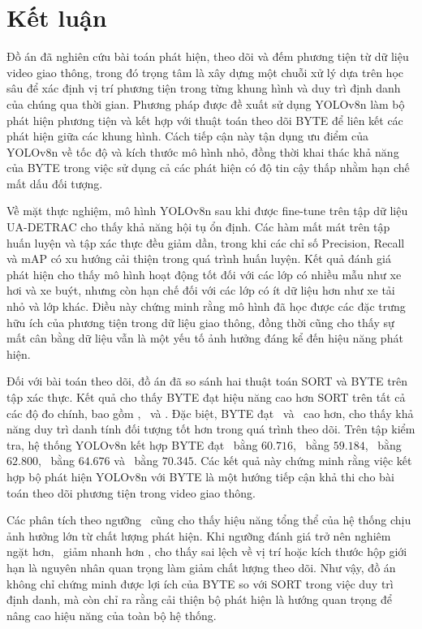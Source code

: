 \section{Kết luận}

Đồ án đã nghiên cứu bài toán phát hiện, theo dõi và đếm phương tiện từ dữ liệu
video giao thông, trong đó trọng tâm là xây dựng một chuỗi xử lý dựa trên học
sâu để xác định vị trí phương tiện trong từng khung hình và duy trì định danh
của chúng qua thời gian. Phương pháp được đề xuất sử dụng YOLOv8n làm bộ phát
hiện phương tiện và kết hợp với thuật toán theo dõi BYTE để liên kết các phát
hiện giữa các khung hình. Cách tiếp cận này tận dụng ưu điểm của YOLOv8n về tốc
độ và kích thước mô hình nhỏ, đồng thời khai thác khả năng của BYTE trong việc
sử dụng cả các phát hiện có độ tin cậy thấp nhằm hạn chế mất dấu đối tượng.

Về mặt thực nghiệm, mô hình YOLOv8n sau khi được fine-tune trên tập dữ liệu
UA-DETRAC cho thấy khả năng hội tụ ổn định. Các hàm mất mát trên tập huấn
luyện và tập xác thực đều giảm dần, trong khi các chỉ số Precision, Recall và
mAP có xu hướng cải thiện trong quá trình huấn luyện. Kết quả đánh giá phát
hiện cho thấy mô hình hoạt động tốt đối với các lớp có nhiều mẫu như xe hơi và
xe buýt, nhưng còn hạn chế đối với các lớp có ít dữ liệu hơn như xe tải nhỏ và
lớp khác. Điều này chứng minh rằng mô hình đã học được các đặc trưng hữu ích
của phương tiện trong dữ liệu giao thông, đồng thời cũng cho thấy sự mất cân
bằng dữ liệu vẫn là một yếu tố ảnh hưởng đáng kể đến hiệu năng phát hiện.

Đối với bài toán theo dõi, đồ án đã so sánh hai thuật toán SORT và BYTE trên
tập xác thực. Kết quả cho thấy BYTE đạt hiệu năng cao hơn SORT trên tất cả các
độ đo chính, bao gồm \HOTA, \MOTA\ và \IDFone. Đặc biệt, BYTE đạt \AssA\ và
\IDFone\ cao hơn, cho thấy khả năng duy trì danh tính đối tượng tốt hơn trong
quá trình theo dõi. Trên tập kiểm tra, hệ thống YOLOv8n kết hợp BYTE đạt
\HOTA\ bằng $60.716$, \DetA\ bằng $59.184$, \AssA\ bằng $62.800$, \MOTA\ bằng
$64.676$ và \IDFone\ bằng $70.345$. Các kết quả này chứng minh rằng việc kết
hợp bộ phát hiện YOLOv8n với BYTE là một hướng tiếp cận khả thi cho bài toán
theo dõi phương tiện trong video giao thông.

Các phân tích theo ngưỡng \HOTA\ cũng cho thấy hiệu năng tổng thể của hệ thống
chịu ảnh hưởng lớn từ chất lượng phát hiện. Khi ngưỡng đánh giá trở nên nghiêm
ngặt hơn, \DetA\ giảm nhanh hơn \AssA, cho thấy sai lệch về vị trí hoặc kích
thước hộp giới hạn là nguyên nhân quan trọng làm giảm chất lượng theo dõi. Như
vậy, đồ án không chỉ chứng minh được lợi ích của BYTE so với SORT trong việc
duy trì định danh, mà còn chỉ ra rằng cải thiện bộ phát hiện là hướng quan
trọng để nâng cao hiệu năng của toàn bộ hệ thống.

